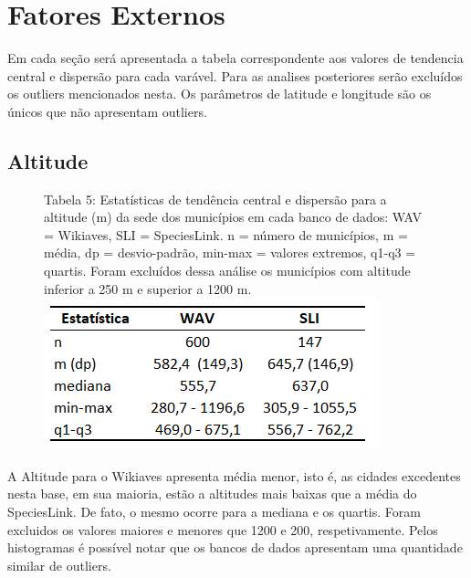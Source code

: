 \section{Fatores Externos}

\begin{resposta}
Em cada seção será apresentada a tabela correspondente aos valores de tendencia central e dispersão para cada varável. Para as analises posteriores serão excluídos os outliers mencionados nesta. Os parâmetros de latitude e longitude são os únicos que não apresentam outliers.
\end{resposta}


\subsection {Altitude}

\begin{figure}[h!]
\centering
{\scriptsize Tabela 5: Estatísticas de tendência central e dispersão para a altitude (m) da sede dos municípios em cada banco de dados: WAV = Wikiaves, SLI = SpeciesLink. n = número de municípios, m = média, dp = desvio-padrão, min-max = valores extremos, q1-q3 = quartis. Foram excluídos dessa análise os municípios com altitude inferior a 250 m e superior a 1200 m.}
\includegraphics{Imagens/T05.png}
\end{figure}


\begin{resposta}
A Altitude para o Wikiaves apresenta média menor, isto é, as cidades excedentes nesta base, em sua maioria, estão a altitudes mais baixas que a média do SpeciesLink. De fato, o mesmo ocorre para a mediana e os quartis. Foram excluidos os valores maiores e menores que 1200 e 200, respetivamente. Pelos histogramas é possível notar que os bancos de dados apresentam uma quantidade similar de outliers. 
\end{resposta}



